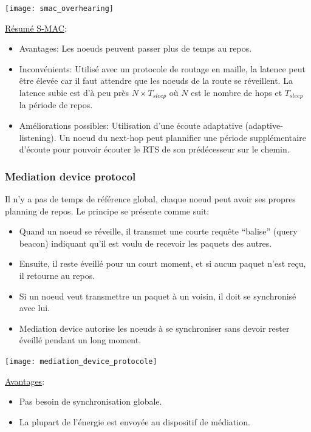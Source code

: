 \documentclass{article}
\begin{document}
\begin{sffamily}
\texttt{[image: smac\_overhearing]}

\underline{Résumé S-MAC}:
\begin{itemize}
\item Avantages: Les noeuds peuvent passer plus de temps au repos.
\item Inconvénients: Utilisé avec un protocole de routage en maille,
  la latence peut être élevée car il faut attendre que les noeuds
  de la route se réveillent. La latence subie est d'à peu près
  $N \times T_{sleep}$ où $N$ est le nombre de hops et $T_{sleep}$
  la période de repos.
\item Améliorations possibles:
  Utilisation d'une écoute adaptative (adaptive-listening).
  Un noeud du next-hop peut plannifier une période supplémentaire
  d'écoute pour pouvoir écouter le RTS de son prédécesseur sur le chemin.
\end{itemize}

\subsubsection{Mediation device protocol}
Il n'y a pas de temps de référence global, chaque noeud peut avoir
ses propres planning de repos.
Le principe se présente comme suit:
\begin{itemize}
\item Quand un noeud se réveille, il transmet une courte requête ``balise''
  (query beacon)
  indiquant qu'il est voulu de recevoir les paquets des autres.
\item Ensuite, il reste éveillé pour un court moment, et si aucun paquet
  n'est reçu, il retourne au repos.
\item Si un noeud veut transmettre un paquet à un voisin, il doit se
  synchronisé avec lui.
\item Mediation device autorise les noeuds à se synchroniser sans devoir
  rester éveillé pendant un long moment.
\end{itemize}

\vspace{5px}
\texttt{[image: mediation\_device\_protocole]}
\vspace{5px}

\underline{Avantages}:
\begin{itemize}
\item Pas besoin de synchronisation globale.
\item La plupart de l'énergie est envoyée au dispositif de médiation.
\end{itemize}


\end{sffamily}
\end{document}
